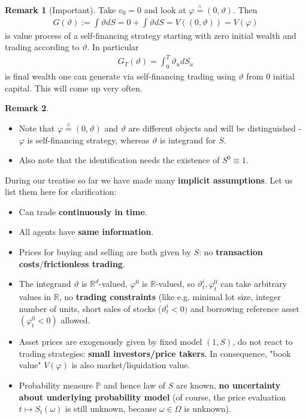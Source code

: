 \documentclass[12pt,a4paper, twoside]{article}
\theoremstyle{definition}
\newtheorem{rem}{Remark}[section]
\newcommand{\PP}{\mathbb{P}} %
\newcommand{\teq}{\overset{\wedge}{=}}
\begin{document}
\begin{rem}[Important] Take $v_0=0$ and look at $\varphi \teq (0, \vartheta)$. Then 
\begin{align*}
G(\vartheta):= \int \vartheta dS = 0 + \int \vartheta dS = V((0, \vartheta))=V(\varphi)
\end{align*}
is value process of a self-financing strategy starting with zero initial wealth and trading according to $\vartheta$. In particular 
\begin{align*}
G_T( \vartheta) = \int_0^T \vartheta_u dS_u
\end{align*}
is final wealth one can generate via self-financing trading using $\vartheta$ from $0$ initial capital. This will come up very often. 
\end{rem}
\begin{rem} \ \begin{itemize}
\item Note that $\varphi \teq (0, \vartheta)$ and $\vartheta$ are different objects and will be distinguished - $\varphi$ is self-financing strategy, whereas $\vartheta$ is integrand for $S$. 
\item Also note that the identification needs the existence of $S^0 \equiv 1$. 
\end{itemize}
\end{rem}
\newpage
During our treatise so far we have made many \textbf{implicit assumptions}. Let us list them here for clarification:
\begin{itemize}
\item Can trade \textbf{continuously in time}.
\item All agents have \textbf{same information}.
\item Prices for buying and selling are both given by $S$: no \textbf{transaction costs}/\textbf{frictionless trading}.
\item The integrand $\vartheta$ is $\mathbb{R}^d$-valued, $\varphi^0$ is $\mathbb{R}$-valued, so $\vartheta_t^i, \varphi_t^0$ can take arbitrary values in $\mathbb{R}$, no \textbf{trading constraints} (like e.g. minimal lot size, integer number of units, short sales of stocks ($\vartheta_t^i < 0)$ and borrowing reference asset $( \varphi_t^0 < 0)$ allowed. 
\item Asset prices are exogenously given by fixed model $(1,S)$, do not react to trading strategies: \textbf{small investors/price takers}. In consequence, "book value" $V( \varphi)$ is also market/liquidation value.
\item Probability measure $\PP$ and hence law of $S$ are known, \textbf{no uncertainty about underlying probability model} (of course, the price evaluation $t \mapsto S_t( \omega)$ is still unknown, because $\omega \in \Omega$ is unknown). 
\end{itemize}
\end{document}
